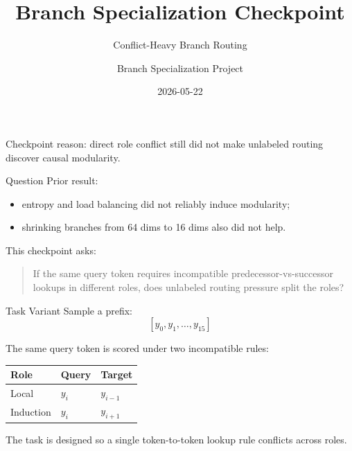 \documentclass[aspectratio=169]{beamer}
\title{Branch Specialization Checkpoint}
\subtitle{Conflict-Heavy Branch Routing}
\author{Branch Specialization Project}
\date{2026-05-22}
\begin{document}
\begin{frame}
  \titlepage
  \vspace{-0.5em}
  \begin{center}
    Checkpoint reason: direct role conflict still did not make unlabeled routing discover causal modularity.
  \end{center}
\end{frame}

\begin{frame}{Question}
  Prior result:
  \begin{itemize}
    \item entropy and load balancing did not reliably induce modularity;
    \item shrinking branches from 64 dims to 16 dims also did not help.
  \end{itemize}

  \vspace{0.8em}
  This checkpoint asks:

  \begin{quote}
    If the same query token requires incompatible predecessor-vs-successor
    lookups in different roles, does unlabeled routing pressure split the roles?
  \end{quote}
\end{frame}

\begin{frame}{Task Variant}
  Sample a prefix:
  \[
    [y_0, y_1, \ldots, y_{15}]
  \]

  \vspace{0.4em}
  The same query token is scored under two incompatible rules:

  \begin{center}
  \begin{tabular}{lll}
    \toprule
    Role & Query & Target \\
    \midrule
    Local & $y_i$ & $y_{i-1}$ \\
    Induction & $y_i$ & $y_{i+1}$ \\
    \bottomrule
  \end{tabular}
  \end{center}

  \vspace{0.4em}
  The task is designed so a single token-to-token lookup rule conflicts across roles.
\end{frame}
\end{document}
